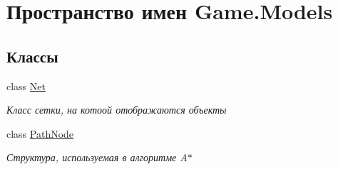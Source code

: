 \hypertarget{namespace_game_1_1_models}{}\section{Пространство имен Game.\+Models}
\label{namespace_game_1_1_models}
\subsection*{Классы}
\begin{DoxyCompactItemize}
\item 
class \hyperlink{class_game_1_1_models_1_1_net}{Net}
\begin{DoxyCompactList}\small\item\em Класс сетки, на котоой отображаются объекты \end{DoxyCompactList}\item 
class \hyperlink{class_game_1_1_models_1_1_path_node}{Path\+Node}
\begin{DoxyCompactList}\small\item\em Структура, используемая в алгоритме A$\ast$ \end{DoxyCompactList}\end{DoxyCompactItemize}
